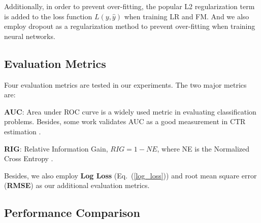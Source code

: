 \documentclass[conference]{IEEEtran}
\newcommand{\weinan}[1]{{\bf \color{red} [[Weinan says ``#1'']]}}
\newcommand{\kan}[1]{{\bf \color{green} [[Kan says ``#1'']]}}
\begin{document}
Additionally, in order to prevent over-fitting, the popular L2 regularization term is added to the loss function $ L(y,\hat{y})$ when training LR and FM.
And we also employ dropout as a regularization method to prevent over-fitting when training neural networks.



\subsection{Evaluation Metrics}
Four evaluation metrics are tested in our experiments. The two major metrics are:

\textbf{AUC}: Area under ROC curve is a widely used metric in evaluating classification problems. Besides, some work validates AUC as a good measurement in CTR estimation \cite{graepel2010web}.

\textbf{RIG}: Relative Information Gain, $RIG = 1 - NE$, where NE is the Normalized Cross Entropy \cite{he2014practical}.

Besides, we also employ \textbf{Log Loss} (Eq.~(\ref{log_loss})) and root mean square error (\textbf{RMSE}) as our additional evaluation metrics.


\subsection{Performance Comparison}
\end{document}
